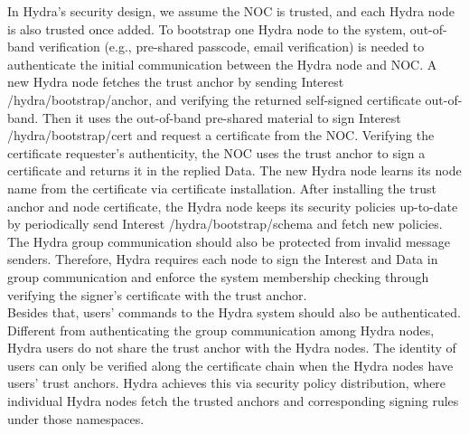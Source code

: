 In Hydra’s security design, we assume the NOC is trusted, and each Hydra node is also trusted once added. To bootstrap one Hydra node to the system, out-of-band verification (e.g., pre-shared passcode, email verification) is needed to authenticate the initial communication between the Hydra node and NOC. A new Hydra node fetches the trust anchor by sending Interest /hydra/bootstrap/anchor, and verifying the returned self-signed certificate out-of-band. Then it uses the out-of-band pre-shared material to sign Interest /hydra/bootstrap/cert and request a certificate from the NOC. Verifying the certificate requester’s authenticity, the NOC uses the trust anchor to sign a certificate and returns it in the replied Data. The new Hydra node learns its node name from the certificate via certificate installation. After installing the trust anchor and node certificate, the Hydra node keeps its security policies up-to-date by periodically send Interest /hydra/bootstrap/schema and fetch new policies.
\\The Hydra group communication should also be protected from invalid message senders. Therefore, Hydra requires each node to sign the Interest and Data in group communication and enforce the system membership checking through verifying the signer’s certificate with the trust anchor.
\\Besides that, users’ commands to the Hydra system should also be authenticated. Different from authenticating the group communication among Hydra nodes, Hydra users do not share the trust anchor with the Hydra nodes. The identity of users can only be verified along the certificate chain when the Hydra nodes have users’ trust anchors. Hydra achieves this via security policy distribution, where individual Hydra nodes fetch the trusted anchors and corresponding signing rules under those namespaces.